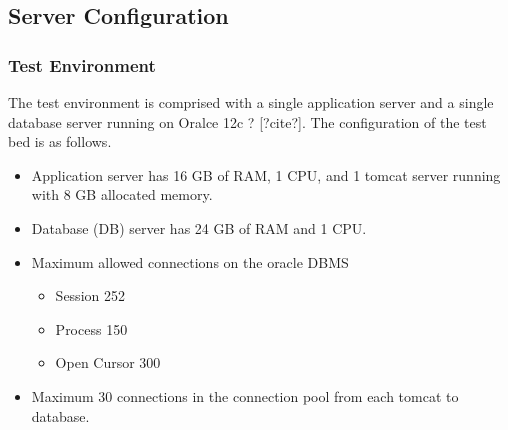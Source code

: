 \documentclass[sigconf,authordraft]{acmart}
\begin{document}
\subsection{Server Configuration}
\subsubsection{Test Environment}
The test environment is comprised with a single application server and a single database server running on Oralce 12c ? [?cite?]. The configuration of the test bed is as follows.
\begin{itemize}
	\item Application server has 16 GB of RAM, 1 CPU, and 1 tomcat server running with 8 GB allocated memory.
	\item Database (DB) server has 24 GB of RAM and 1 CPU.
	\item Maximum allowed connections on the oracle DBMS
	\begin{itemize}
		\item Session 252
		\item Process 150
		\item Open Cursor 300
	\end{itemize}
	\item Maximum 30 connections in the connection pool from each tomcat to database.
\end{itemize}
\end{document}
